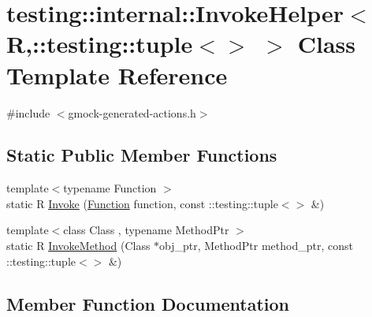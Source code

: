 \hypertarget{classtesting_1_1internal_1_1InvokeHelper_3_01R_00_1_1testing_1_1tuple_3_4_01_4}{}\section{testing\+:\+:internal\+:\+:Invoke\+Helper$<$ R,\+:\+:testing\+:\+:tuple$<$$>$ $>$ Class Template Reference}
\label{classtesting_1_1internal_1_1InvokeHelper_3_01R_00_1_1testing_1_1tuple_3_4_01_4}


{\ttfamily \#include $<$gmock-\/generated-\/actions.\+h$>$}

\subsection*{Static Public Member Functions}
\begin{DoxyCompactItemize}
\item 
{\footnotesize template$<$typename Function $>$ }\\static R \hyperlink{classtesting_1_1internal_1_1InvokeHelper_3_01R_00_1_1testing_1_1tuple_3_4_01_4_aa695e527af9f3efc6c8098c2467e5e7c}{Invoke} (\hyperlink{structtesting_1_1internal_1_1Function}{Function} function, const \+::testing\+::tuple$<$$>$ \&)
\item 
{\footnotesize template$<$class Class , typename Method\+Ptr $>$ }\\static R \hyperlink{classtesting_1_1internal_1_1InvokeHelper_3_01R_00_1_1testing_1_1tuple_3_4_01_4_acd2b09ae48134b49f388be348b0d8c72}{Invoke\+Method} (Class $\ast$obj\+\_\+ptr, Method\+Ptr method\+\_\+ptr, const \+::testing\+::tuple$<$$>$ \&)
\end{DoxyCompactItemize}


\subsection{Member Function Documentation}
